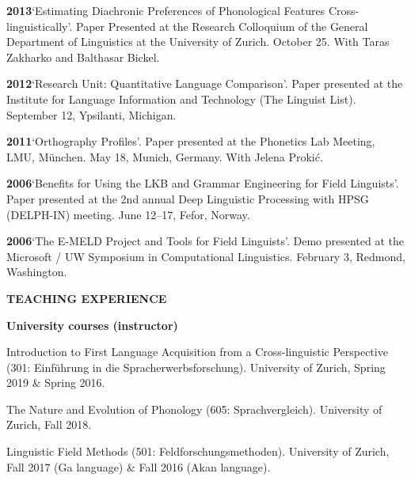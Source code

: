 \documentclass[11pt]{article}
\newcommand{\hangpara}{
 \setlength{\parindent}{0in} %
 \hangindent=0.42in %
}
\begin{document}
\vskip 6pt
\hangpara
{\bf 2013}\hspace{1ex}`Estimating Diachronic Preferences of Phonological Features Cross-linguistically'. Paper Presented at the Research Colloquium of the General Department of Linguistics at the University of Zurich. October 25. With Taras Zakharko and Balthasar Bickel.

\vskip 6pt
\hangpara
{\bf 2012}\hspace{1ex}`Research Unit: Quantitative Language Comparison'. Paper presented at the Institute for Language Information and Technology (The Linguist List). September 12, Ypsilanti, Michigan.

\vskip 6pt
\hangpara
{\bf 2011}\hspace{1ex}`Orthography Profiles'. Paper presented at the Phonetics Lab Meeting, LMU, M{\"u}nchen. May 18, Munich, Germany. With Jelena Proki{\'c}.

\vskip 6pt
\hangpara
{\bf 2006}\hspace{1ex}`Benefits for Using the LKB and Grammar Engineering for Field Linguists'. Paper presented at the 2nd annual Deep Linguistic Processing with HPSG (DELPH-IN) meeting. June 12--17, Fefor, Norway.

\vskip 6pt
\hangpara
{\bf 2006}\hspace{1ex}`The E-MELD Project and Tools for Field Linguists'. Demo presented at the Microsoft / UW Symposium in Computational Linguistics. February 3, Redmond, Washington.


\vskip 20pt
\begin{flushleft}
{\bf TEACHING EXPERIENCE}
\end{flushleft}

\begin{flushleft}
{\bf University courses (instructor)}
\end{flushleft}


\hangpara Introduction to First Language Acquisition from a Cross-linguistic Perspective (301: Einf{\"u}hrung in die Spracherwerbsforschung). University of Zurich, Spring 2019 \& Spring 2016.

\vskip 6pt
\hangpara The Nature and Evolution of Phonology (605: Sprachvergleich). University of Zurich, Fall 2018.

\vskip 6pt
\hangpara Linguistic Field Methods (501: Feldforschungsmethoden). University of Zurich, Fall 2017 (Ga language) \& Fall 2016 (Akan language).
\end{document}
